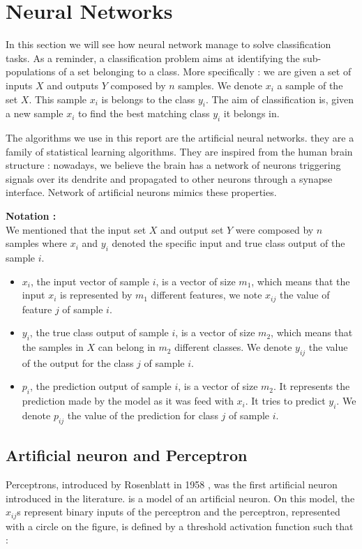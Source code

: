 
\section{Neural Networks}
\label{sec:neural_networks}
	
	In this section we will see how neural network manage to solve classification tasks. As a reminder, a classification problem aims at identifying the sub-populations of a set belonging to a class. More specifically : we are given a set of inputs $X$ and outputs $Y$ composed by $n$ samples. We denote $x_i$ a sample of the set $X$. This sample $x_i$ is belongs to the class $y_i$. The aim of classification is, given a new sample $x_i$ to find the best matching class $y_i$ it belongs in.

	The algorithms we use in this report are the artificial neural networks. they are a family of statistical learning algorithms. They are inspired from the human brain structure : nowadays, we believe the brain has a network of neurons triggering signals over its dendrite and propagated to other neurons through a synapse interface. Network of artificial neurons mimics these properties.

	\vspace{1em}
	\textbf{Notation : }\\
	We mentioned that the input set $X$ and output set $Y$ were composed by $n$ samples where $x_i$ and $y_i$ denoted the specific input and true class output of the sample $i$. 
	\begin{itemize}
		\item $x_i$, the input vector of sample $i$, is a vector of size $m_1$, which means that the input $x_i$ is represented by $m_1$ different features, we note $x_{ij}$ the value of feature $j$ of sample $i$.
		\item $y_i$, the true class output of sample $i$, is a vector of size $m_2$, which means that the samples in $X$ can belong in $m_2$ different classes. We denote $y_{ij}$ the value of the output for the class $j$ of sample $i$.
		\item $p_i$, the prediction output of sample $i$, is a vector of size $m_2$. It represents the prediction made by the model as it was feed with $x_i$. It tries to predict $y_i$. We denote $p_{ij}$ the value of the prediction for class $j$ of sample $i$.
	\end{itemize} 


	\subsection{Artificial neuron and Perceptron}
		Perceptrons, introduced by Rosenblatt in 1958 \cite{rosenblatt1958perceptron}, was the first artificial neuron introduced in the literature.  is a model of an artificial neuron. On this model, the $x_{ij}$s represent binary inputs of the perceptron and the perceptron, represented with a circle on the figure, is defined by a threshold activation function such that :

